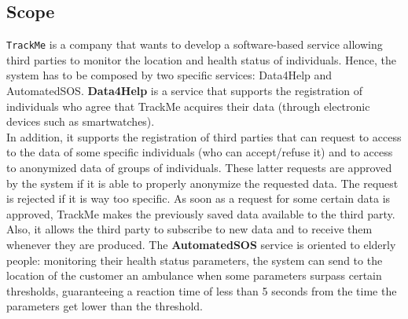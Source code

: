 \documentclass[12pt,a4paper]{article}
\begin{document}
	\subsection{Scope}
	\texttt{TrackMe} is a company that wants to develop a software-based service allowing third parties to monitor the location and health status of individuals.
	Hence, the system has to be composed by two specific services: Data4Help and AutomatedSOS.
	\textbf{Data4Help} is a service that supports the registration of individuals who agree that TrackMe acquires their data (through electronic devices such as smartwatches). \\In addition, it supports the registration of third parties that can request to access to the data of some specific individuals (who can accept/refuse it) and to access to anonymized data of groups of individuals. These latter requests are approved by the system if it is able to properly anonymize the requested data. The request is rejected if it is way too specific. As soon as a request for some certain data is approved, TrackMe makes the previously saved data available to the third party. Also, it allows the third party to subscribe to new data and to receive them whenever they are produced. The \textbf{AutomatedSOS} service is oriented to elderly people: monitoring their health status parameters, the system can send to the location of the customer an ambulance when some parameters surpass certain thresholds, guaranteeing a reaction time of less than 5 seconds from the time the parameters get lower than the threshold. 

	\newpage
\end{document}
